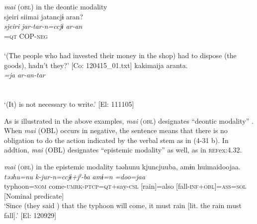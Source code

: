 \ea  \textit{mai} (\textsc{obl}) in the deontic modality \label{ex:4.31}
  \ea{}\\
\gllll {\textbar}sjeiri{\textbar}  siimai  jatancjɨ  aran?\\
      \textit{sjeiri}  \textit{}  \textit{jar-tar-n=ccjɨ}  \textit{ar-an}\\
      [disposal  do-\textsc{inf}+\textsc{obl}  \textsc{cop}-\textsc{pst}-\textsc{ptcp}]=\textsc{qt}  COP-\textsc{neg}\\
      [Nominal predicate]  \\
      \glt       ‘(The people who had invested their money in the shop) had to dispose (the goods), hadn’t they?’ [Co: 120415\_01.txt]
\ex \label{ex:4.31b}%
\gllll kakimaija  aranta.\\
      \textit{=ja}  \textit{ar-an-tar}\\
      [write-\textsc{inf}+\textsc{obl}=\textsc{top}  \textsc{cop}-\textsc{neg}-\textsc{pst}]\\
      [Nominal predicate]\\
      \glt       ‘(It) is not necessary to write.’ [El: 111105]
    \z
\z

As is illustrated in the above examples, \textit{mai} (\textsc{obl}) designates “deontic modality” \citep[823]{Lyons1977}. When \textit{mai} (OBL) occurs in negative, the sentence means that there is no obligation to do the action indicated by the verbal stem as in (4-31 b). In addtion, \textit{mai} (OBL) designates “epistemic modality” \citep[793-809]{Lyons1977} as well, as in \textsc{ref}{ex:4.32}.

\ea  \textit{mai} (\textsc{obl}) in the epistemic modality \label{ex:4.32}
  \gllll təəhunu  kjuncjuuba,  amɨn   huimaidoojaa.\\
    \textit{təəhu=nu}  \textit{k-jur-n=ccjɨ+jˀ-ba}  \textit{amɨ=n} \textit{=doo=jaa}\\                                                                   
    typhoon=\textsc{nom}  come-\textsc{umrk}-\textsc{ptcp}=\textsc{qt}+say-\textsc{csl}  [rain]=also  [fall-\textsc{inf}+\textsc{obl}]=\textsc{ass}=\textsc{sol}\\
        [Subject]                                         [Nominal predicate]\\
  \glt ‘Since (they said ) that the typhoon will come, it must rain [lit. the rain must fall].’  [El: 120929]
\z

